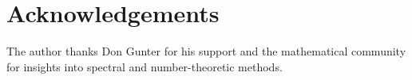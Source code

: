 \section*{Acknowledgements}
\vspace{5pt}
The author thanks Don Gunter for his support and the mathematical community for insights into spectral and number-theoretic methods.